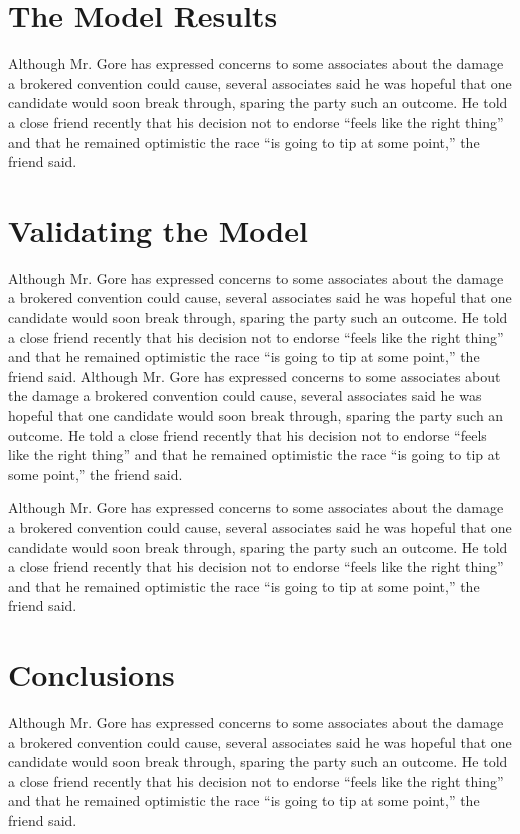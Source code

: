 \section{The Model Results}
Although Mr. Gore has expressed concerns to some associates about
the damage a brokered convention could cause, several associates
said he was hopeful that one candidate would soon break through,
sparing the party such an outcome. He told a close friend recently
that his decision not to endorse ``feels like the right thing''
and that he remained optimistic the race ``is going to tip at some
point,'' the friend said.



\section{Validating the Model}%
Although Mr. Gore has expressed concerns to some associates about
the damage a brokered convention could cause, several associates
said he was hopeful that one candidate would soon break through,
sparing the party such an outcome. He told a close friend recently
that his decision not to endorse ``feels like the right thing''
and that he remained optimistic the race ``is going to tip at some
point,'' the friend said. Although Mr. Gore has expressed concerns
to some associates about the damage a brokered convention could
cause, several associates said he was hopeful that one candidate
would soon break through, sparing the party such an outcome. He
told a close friend recently that his decision not to endorse
``feels like the right thing'' and that he remained optimistic the
race ``is going to tip at some point,'' the friend said.


Although Mr. Gore has expressed concerns to some associates about
the damage a brokered convention could cause, several associates
said he was hopeful that one candidate would soon break through,
sparing the party such an outcome. He told a close friend recently
that his decision not to endorse ``feels like the right thing''
and that he remained optimistic the race ``is going to tip at some
point,'' the friend said.

\section{Conclusions}
Although Mr. Gore has expressed concerns to some associates about
the damage a brokered convention could cause, several associates
said he was hopeful that one candidate would soon break through,
sparing the party such an outcome. He told a close friend recently
that his decision not to endorse ``feels like the right thing''
and that he remained optimistic the race ``is going to tip at some
point,'' the friend said.
